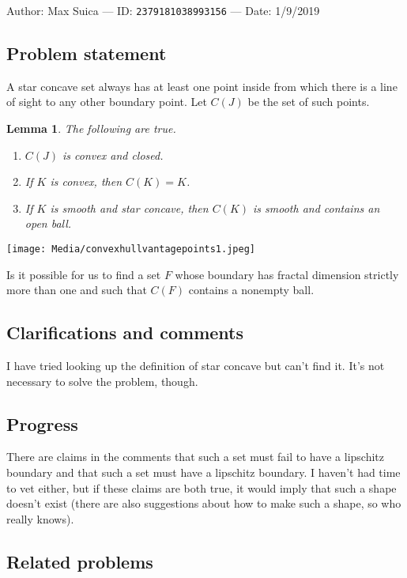 \documentclass[10pt]{article}
\newtheorem{lemma}[theorem]{Lemma}
\begin{document}
Author: Max Suica --- ID: \verb`2379181038993156` --- Date: 1/9/2019

\subsection{Problem statement}

A star concave set always has at least one point inside from which there is a line of sight to any other boundary point. Let $C(J)$ be the set of such points.

\begin{lemma}
  The following are true.
  
  \begin{enumerate}
    \item $C(J)$ is convex and closed.
    \item If $K$ is convex, then $C(K)=K$.
    \item If $K$ is smooth and star concave, then $C(K)$ is smooth and contains an open ball.
  \end{enumerate}
\end{lemma}

\texttt{[image: Media/convexhullvantagepoints1.jpeg]}

Is it possible for us to find a set $F$ whose boundary has fractal dimension strictly more than one and such that $C(F)$ contains a nonempty ball.

\subsection{Clarifications and comments}

I have tried looking up the definition of star concave but can't find it. It's not necessary to solve the problem, though.

\subsection{Progress}

There are claims in the comments that such a set must fail to have a lipschitz boundary and that such a set must have a lipschitz boundary. I haven't had time to vet either, but if these claims are both true, it would imply that such a shape doesn't exist (there are also suggestions about how to make such a shape, so who really knows).

\subsection{Related problems}
\end{document}
